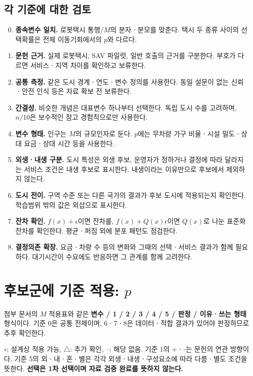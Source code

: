 \documentclass[10pt,a4paper]{article}
\newcommand{\yes}{\ensuremath{\circ}}
\newcommand{\maybe}{\ensuremath{\triangle}}
\begin{document}
\subsection{각 기준에 대한 검토}
\begin{enumerate}
\setcounter{enumi}{-1}
\item \textbf{종속변수 일치.} 로봇택시 통행/$M$의 분자ㆍ분모를 맞춘다. 택시 두 종류 사이의 선택확률은 전체 이동기회에서의 $p$와 다르다.
\item \textbf{문헌 근거.} 실제 로봇택시, SAV 파일럿, 일반 호출의 근거를 구분한다. 부호가 다르면 서비스ㆍ지역 차이를 확인하고 보류한다.
\item \textbf{공통 측정.} 같은 도시 경계ㆍ연도ㆍ변수 정의를 사용한다. 동일 설문이 없는 신뢰ㆍ안전 인식 등은 자료 확보 전 보류한다.
\item \textbf{간결성.} 비슷한 개념은 대표변수 하나부터 선택한다. 독립 도시 수를 고려하며, $n/10$은 보수적인 참고 경험칙으로만 사용한다.
\item \textbf{변수 형태.} 인구는 $M$의 규모인자로 둔다. $p$에는 무차량 가구 비율ㆍ시설 밀도ㆍ상대 요금ㆍ상대 시간 등을 사용한다.
\item \textbf{외생ㆍ내생 구분.} 도시 특성은 외생 후보, 운영자가 정하거나 결정에 따라 달라지는 서비스 조건은 내생 후보로 표시한다. 내생이라는 이유만으로 후보에서 제외하지 않는다.
\item \textbf{도시 전이.} 구역 수준 또는 다른 국가의 결과가 후보 도시에 적용되는지 확인한다. 학습범위 밖의 값은 외삽으로 표시한다.
\item \textbf{잔차 확인.} $f(x)+\epsilon$이면 잔차를, $f(x)+Q(x)\epsilon$이면 $Q(x)$로 나눈 표준화 잔차를 확인한다. 평균ㆍ퍼짐 외에 분포 패턴도 점검한다.
\item \textbf{결정의존 확장.} 요금ㆍ차량 수 등의 변화와 그때의 선택ㆍ서비스 결과가 함께 필요하다. 대기시간이 수요에도 반응하면 그 관계를 함께 고려한다.
\end{enumerate}

\section{후보군에 기준 적용: $p$}
첨부 문서의 $M$ 적용표와 같은 \textbf{변수 / 1 / 2 / 3 / 4 / 5 / 판정 / 이유ㆍ쓰는 형태} 형식이다. 기준 0은 공통 전제이며, 6ㆍ7ㆍ8은 데이터ㆍ적합 결과가 있어야 판정하므로 추후 확인한다.

\yes: 설계상 적용 가능, \maybe: 추가 확인, --: 해당 없음. 기준 1의 +ㆍ-는 문헌의 연관 방향이다. 기준 5의 외ㆍ내ㆍ혼ㆍ별은 각각 외생ㆍ내생ㆍ구성요소에 따라 다름ㆍ별도 조건을 뜻한다. \textbf{선택은 1차 선택이며 자료 검증 완료를 뜻하지 않는다.}
\end{document}
